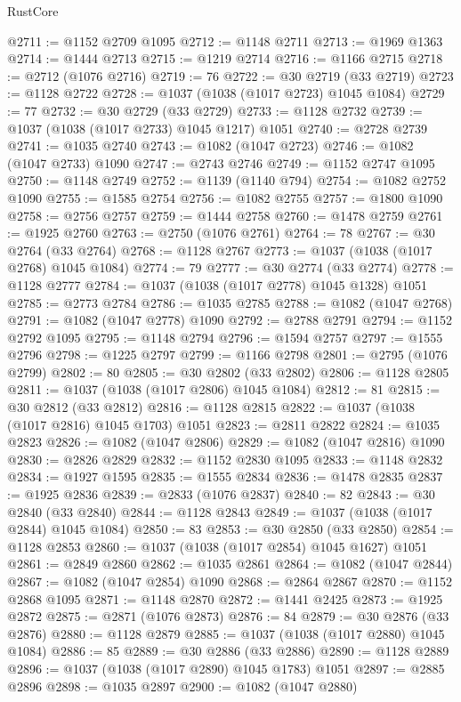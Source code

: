 \begin{lexlean}{RustCore}
\begin{coremodule}
@2711 := @1152 @2709 @1095
@2712 := @1148 @2711
@2713 := @1969 @1363
@2714 := @1444 @2713
@2715 := @1219 @2714
@2716 := @1166 @2715
@2718 := @2712 (@1076 @2716)
@2719 := 76
@2722 := @30 @2719 (@33 @2719)
@2723 := @1128 @2722
@2728 := @1037 (@1038 (@1017 @2723) @1045 @1084)
@2729 := 77
@2732 := @30 @2729 (@33 @2729)
@2733 := @1128 @2732
@2739 := @1037 (@1038 (@1017 @2733) @1045 @1217) @1051
@2740 := @2728 @2739
@2741 := @1035 @2740
@2743 := @1082 (@1047 @2723)
@2746 := @1082 (@1047 @2733) @1090
@2747 := @2743 @2746
@2749 := @1152 @2747 @1095
@2750 := @1148 @2749
@2752 := @1139 (@1140 @794)
@2754 := @1082 @2752 @1090
@2755 := @1585 @2754
@2756 := @1082 @2755
@2757 := @1800 @1090
@2758 := @2756 @2757
@2759 := @1444 @2758
@2760 := @1478 @2759
@2761 := @1925 @2760
@2763 := @2750 (@1076 @2761)
@2764 := 78
@2767 := @30 @2764 (@33 @2764)
@2768 := @1128 @2767
@2773 := @1037 (@1038 (@1017 @2768) @1045 @1084)
@2774 := 79
@2777 := @30 @2774 (@33 @2774)
@2778 := @1128 @2777
@2784 := @1037 (@1038 (@1017 @2778) @1045 @1328) @1051
@2785 := @2773 @2784
@2786 := @1035 @2785
@2788 := @1082 (@1047 @2768)
@2791 := @1082 (@1047 @2778) @1090
@2792 := @2788 @2791
@2794 := @1152 @2792 @1095
@2795 := @1148 @2794
@2796 := @1594 @2757
@2797 := @1555 @2796
@2798 := @1225 @2797
@2799 := @1166 @2798
@2801 := @2795 (@1076 @2799)
@2802 := 80
@2805 := @30 @2802 (@33 @2802)
@2806 := @1128 @2805
@2811 := @1037 (@1038 (@1017 @2806) @1045 @1084)
@2812 := 81
@2815 := @30 @2812 (@33 @2812)
@2816 := @1128 @2815
@2822 := @1037 (@1038 (@1017 @2816) @1045 @1703) @1051
@2823 := @2811 @2822
@2824 := @1035 @2823
@2826 := @1082 (@1047 @2806)
@2829 := @1082 (@1047 @2816) @1090
@2830 := @2826 @2829
@2832 := @1152 @2830 @1095
@2833 := @1148 @2832
@2834 := @1927 @1595
@2835 := @1555 @2834
@2836 := @1478 @2835
@2837 := @1925 @2836
@2839 := @2833 (@1076 @2837)
@2840 := 82
@2843 := @30 @2840 (@33 @2840)
@2844 := @1128 @2843
@2849 := @1037 (@1038 (@1017 @2844) @1045 @1084)
@2850 := 83
@2853 := @30 @2850 (@33 @2850)
@2854 := @1128 @2853
@2860 := @1037 (@1038 (@1017 @2854) @1045 @1627) @1051
@2861 := @2849 @2860
@2862 := @1035 @2861
@2864 := @1082 (@1047 @2844)
@2867 := @1082 (@1047 @2854) @1090
@2868 := @2864 @2867
@2870 := @1152 @2868 @1095
@2871 := @1148 @2870
@2872 := @1441 @2425
@2873 := @1925 @2872
@2875 := @2871 (@1076 @2873)
@2876 := 84
@2879 := @30 @2876 (@33 @2876)
@2880 := @1128 @2879
@2885 := @1037 (@1038 (@1017 @2880) @1045 @1084)
@2886 := 85
@2889 := @30 @2886 (@33 @2886)
@2890 := @1128 @2889
@2896 := @1037 (@1038 (@1017 @2890) @1045 @1783) @1051
@2897 := @2885 @2896
@2898 := @1035 @2897
@2900 := @1082 (@1047 @2880)

\end{coremodule}
\end{lexlean}
